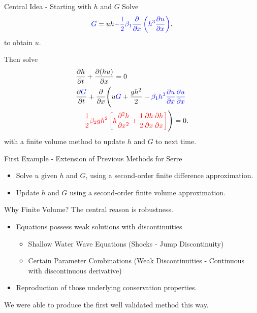\documentclass[pdf]{beamer}
\begin{document}
\begin{frame}{Central Idea - Starting with $h$ and $G$}
Solve
\begin{gather*}
{\color{blue} G} = uh {\color{blue} - \frac{1}{2} \beta_1\dfrac{\partial }{\partial x} \left ( h^3 \dfrac{\partial u}{\partial x} \right )}.
\end{gather*}
to obtain $u$.

\bigskip
\pause
Then solve
\begin{align*}
&\dfrac{\partial h}{\partial t} + \dfrac{\partial (hu)}{\partial x} = 0\\
&\dfrac{\partial {\color{blue} G} }{\partial t}  + \dfrac{\partial}{\partial x} \Bigg( u{\color{blue} G} + \dfrac{gh^2}{2} - {\color{blue} \beta_1 h^3\dfrac{\partial u}{\partial x}\dfrac{\partial u}{\partial x} } \\ &- {\color{red}\frac{1}{2} \beta_2 g h^2  \left[h\frac{\partial^2 h}{\partial x^2} +   \frac{1}{2}\frac{\partial h}{\partial x}\frac{\partial h}{\partial x}\right] } \Bigg) = 0.
\end{align*}
with a finite volume method to update $h$ and $G$ to next time. 
\end{frame}

\begin{frame}{First Example - Extension of Previous Methods for Serre}
\begin{itemize}
	\item Solve $u$ given $h$ and $G$, using a second-order finite difference approximation.
	\item Update $h$ and $G$ using a second-order finite volume approximation.
\end{itemize}
\end{frame}

\begin{frame}{Why Finite Volume?}
The central reason is robustness.
\begin{itemize}
	\item Equations possess weak solutions with discontinuities 
	\begin{itemize}
	\item Shallow Water Wave Equations (Shocks - Jump Discontinuity)
	\item Certain Parameter Combinations (Weak Discontinuities - Continuous with discontinuous derivative)
	\end{itemize}
	\item Reproduction of those underlying conservation properties.
\end{itemize}
We were able to produce the first well validated method this way. 
\end{frame}
\end{document}
